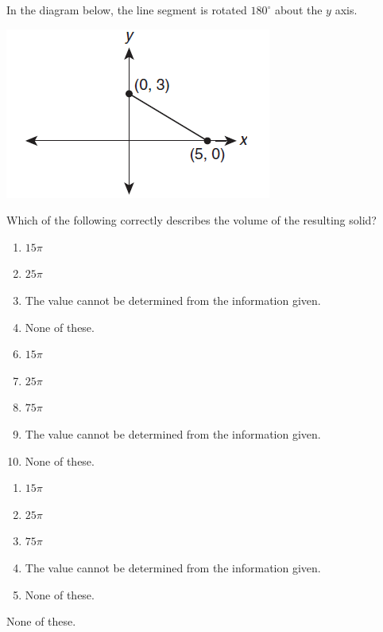


 In the diagram below, the line segment is rotated $180^{\circ}$ about the $y$ axis.

\includegraphics[]{support/Capture12.png}

Which of the following correctly describes the volume of the resulting solid?


\ifsat
	\begin{enumerate}[label=\Alph*)]
		\item   $15\pi$
		\item  $25\pi$
		\item  The value cannot be determined from the information given.
		\item    None of these.%
	\end{enumerate}
\else
\fi

\ifacteven
	\begin{enumerate}[label=\textbf{\Alph*.},itemsep=\fill,align=left]
		\setcounter{enumii}{5}
		\item   $15\pi$
		\item  $25\pi$
		\item $75\pi$
		\addtocounter{enumii}{1}
		\item  The value cannot be determined from the information given.
		\item    None of these.%
	\end{enumerate}
\else
\fi

\ifactodd
	\begin{enumerate}[label=\textbf{\Alph*.},itemsep=\fill,align=left]
		\item   $15\pi$
		\item  $25\pi$
		\item $75\pi$
		\item  The value cannot be determined from the information given.
		\item    None of these.%
	\end{enumerate}
\else
\fi

\ifgridin
    None of these.%

\else
\fi

